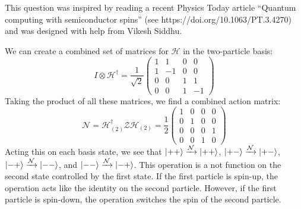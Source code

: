 \documentclass[a4paper,twoside]{article}
\begin{document}
\begin{itemize}
This question was inspired by reading a recent Physics Today article “Quantum computing with semiconductor spins” (see https://doi.org/10.1063/PT.3.4270) and was designed with help from Vikesh Siddhu.
\begin{tcolorbox}[breakable]
    We can create a combined set of matrices for $\mathcal{H}$ in the two-particle basis:
    \begin{equation}
        I\otimes\mathcal{H}^\dagger =\frac{1}{\sqrt{2}} \begin{pmatrix} 1&1&0&0\\1&-1&0&0\\0&0&1&1\\0&0&1&-1 \end{pmatrix} 
    \end{equation}
    Taking the product of all these matrices, we find a combined action matrix:
    \begin{equation}
        \mathcal{N} = \mathcal{H}^\dagger_{(2)}\mathcal{Z}\mathcal{H}_{(2)} =\frac{1}{2} \begin{pmatrix} 1&0&0&0\\0&1&0&0\\0&0&0&1\\0&0&1&0 \end{pmatrix} 
    \end{equation}
    Acting this on each basis state, we see that $\ket{++}\xrightarrow{\mathcal{N}}\ket{++}$, $\ket{+-}\xrightarrow{\mathcal{N}}\ket{+-}$, $\ket{-+}\xrightarrow{\mathcal{N}}\ket{--}$, and $\ket{--}\xrightarrow{\mathcal{N}}\ket{-+}$. This operation is a not function on the second state controlled by the first state. If the first particle is spin-up, the operation acts like the identity on the second particle. However, if the first particle is spin-down, the operation switches the spin of the second particle.
\end{tcolorbox}

\end{itemize}
\end{document}

